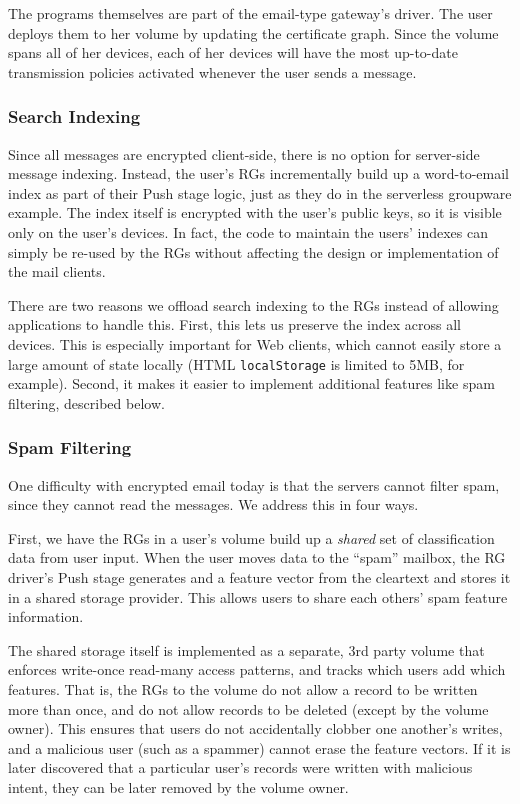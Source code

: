 The programs themselves are part of the email-type gateway's driver.  The user
deploys them to her volume by updating the certificate graph.  Since the volume
spans all of her devices, each of her devices will have the most up-to-date
transmission policies activated whenever the user sends a message.

\subsubsection{Search Indexing}

Since all messages are encrypted client-side, there is no option for server-side
message indexing.  Instead, the user's RGs incrementally build up a
word-to-email index as part of their Push stage logic, just as they do in the
serverless groupware example.  The index itself is
encrypted with the user's public keys, so it is visible only on the user's devices. 
In fact, the code to maintain the users' indexes can simply be re-used by the
RGs without affecting the design or implementation of the mail clients.

There are two reasons we offload search indexing to the RGs instead of allowing
applications to handle this.  First, this lets us preserve the index across all devices. 
This is especially important for Web clients, which cannot easily store a large amount of state
locally (HTML \texttt{localStorage} is limited to 5MB, for example).  Second, it
makes it easier to implement additional features like spam filtering, described below.

\subsubsection{Spam Filtering}

One difficulty with encrypted email today is that the servers cannot filter spam,
since they cannot read the messages.  We address this in four ways.

First, we have the RGs in a user's volume build
up a \emph{shared} set of classification data from user input.  When the user
moves data to the ``spam'' mailbox, the RG driver's Push stage generates and
a feature vector from the cleartext and stores it in a shared storage
provider.  This allows
users to share each others' spam feature information.

The shared storage itself is implemented as a separate, 3rd party volume that enforces write-once read-many
access patterns, and tracks which users add which features.  That is, the RGs to the volume do not allow a record to be
written more than once, and do not allow records to be deleted (except by the
volume owner).  This ensures
that users do not accidentally clobber one another's writes, and a malicious
user (such as a spammer) cannot erase the feature vectors.  If it is later
discovered that a particular user's records were written with malicious intent,
they can be later removed by the volume owner.

